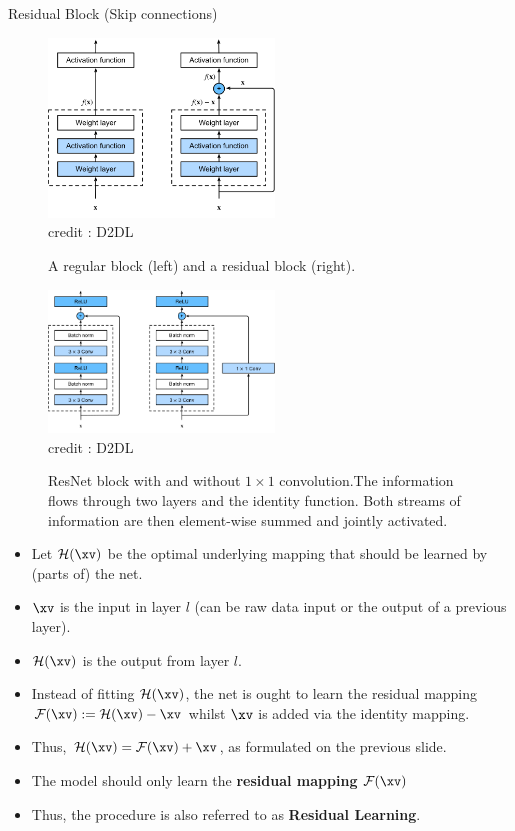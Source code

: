\begin{vbframe}{Residual Block (Skip connections)}
\framebreak
 
 \begin{figure}
  \centering
    \includegraphics[width=6cm]{plots/moderncnn/residual-block.png}
    \tiny{\\ credit : D2DL}
    \caption{A regular block (left) and a residual block (right).}
  \end{figure}

  \begin{figure}
  \centering
    \includegraphics[width=6cm]{plots/moderncnn/resnet-block.png}
    \tiny{\\ credit : D2DL}
    \caption{ResNet block with and without $1 \times 1$ convolution.The information flows through two layers and the identity function. Both streams of information are then element-wise summed and jointly activated.}
  \end{figure}

\framebreak
    \begin{itemize}
        \item Let $\mathcal{H}(\xv)$ be the optimal underlying mapping that should be learned by (parts of) the net.
        \item $\xv$ is the input in layer $l$ (can be raw data input or the output of a previous layer).
        \item $\mathcal{H}(\xv)$ is the output from layer $l$.
        \item Instead of fitting $\mathcal{H}(\xv)$, the net is ought to learn the residual mapping $\mathcal{F}(\xv):=\mathcal{H}(\xv)-\xv$ whilst $\xv$ is added via the identity mapping.
        \item Thus, $\mathcal{H}(\xv) = \mathcal{F}(\xv) + \xv$, as formulated on the previous slide.
        \item The model should only learn the \textbf{residual mapping} $\mathcal{F}(\xv)$ 
        \item Thus, the procedure is also referred to as \textbf{Residual Learning}.
    \end{itemize}
    

\end{vbframe}
